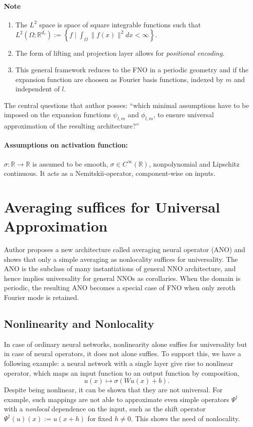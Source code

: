 \documentclass[reqno]{amsart}
\theoremstyle{plain}
\theoremstyle{definition}
\newcommand{\bb}[1]{\mathbb{#1}}
\begin{document}
\paragraph{\bf Note}
\begin{enumerate}
    \item The $L^2$ space is space of square integrable functions such that $L^2(\Omega;\bb R^{d_c}) := \left\{f\mid \int_{\Omega} \|f(x)\|^2 dx < \infty \right\}$.
    \item The form of lifting and projection layer allows for {\it positional encoding}.
    \item This general framework reduces to the FNO in a periodic geometry and if the expansion function are choosen as Fourier basis functions, indexed by $m$ and independent of $l$.
\end{enumerate} 
The central questions that author posses: ``which minimal assumptions have to be imposed on the expansion functions $\psi_{l,m}$ and $\phi_{l,m}$, to ensure universal approximation of the resulting architecture?''
\paragraph{\bf Assumptions on activation function:}$\sigma :\bb R \to \bb R$ is assumed to be smooth, $\sigma \in C^{\infty}(\bb R)$, nonpolynomial and Lipschitz continuous. It acts as a Nemitskii-operator, component-wise on inputs.

\section{\bf \large Averaging suffices for Universal Approximation}
\noindent Author proposes a new architecture called averaging neural operator (ANO) and shows that only a simple averaging as nonlocality suffices for universality. The ANO is the subclass of many instantiations of general NNO architecture, and hence implies universality for general NNOs as corollaries.  
\noindent When the domain is periodic, the resulting ANO becomes a special case of FNO when only zeroth Fourier mode is retained.

\subsection{\bf Nonlinearity and Nonlocality}
In case of ordinary neural networks, nonlinearity alone suffies for universality but in case of neural operators, it does not alone suffies. To support this, we have a following example: a neural network with a single layer give rise to nonlinear operator, which maps an input function to an output function by composition, 
$$ u(x) \mapsto \sigma(Wu(x) + b).$$
Despite being nonlinear, it can be shown that they are not universal. For example, such mappings are not able to approximate even simple operators $\Psi^\dag$ with a {\it nonlocal} dependence on the input, such as the shift operator $\Psi^\dag(u)(x) := u(x+h)$ for fixed $h \neq 0$. This shows the need of nonlocality.
\end{document}
